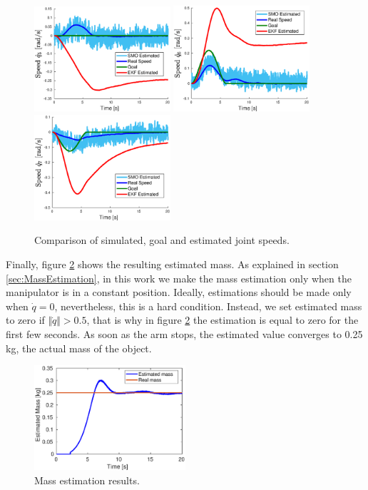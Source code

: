 \documentclass[smallextended]{svjour3}       %
\begin{document}
\begin{figure}
  \includegraphics[width=0.45\textwidth]{Figures/result_qp5.eps}
  \includegraphics[width=0.45\textwidth]{Figures/result_qp6.eps}
  \includegraphics[width=0.45\textwidth]{Figures/result_qp7.eps}
  \caption{Comparison of simulated, goal and estimated joint speeds.}
  \label{fig:result_qp}
\end{figure}

Finally, figure \ref{fig:MassEstimation} shows the resulting estimated mass. As explained in section \ref{sec:MassEstimation}, in this work we make the mass estimation only when the manipulator is in a constant position. Ideally, estimations should be made only when $\dot{q}=0$, nevertheless, this is a hard condition. Instead, we set estimated mass to zero if $\Vert\dot{q}\Vert > 0.5$, that is why in figure \ref{fig:MassEstimation} the estimation is equal to zero for the first few seconds. As soon as the arm stops, the estimated value converges to 0.25 kg, the actual mass of the object. 
\begin{figure}
  \centering
  \includegraphics[width=0.5\textwidth]{Figures/result_mass.eps}
  \caption{Mass estimation results.}
  \label{fig:MassEstimation}
\end{figure}
\end{document}
